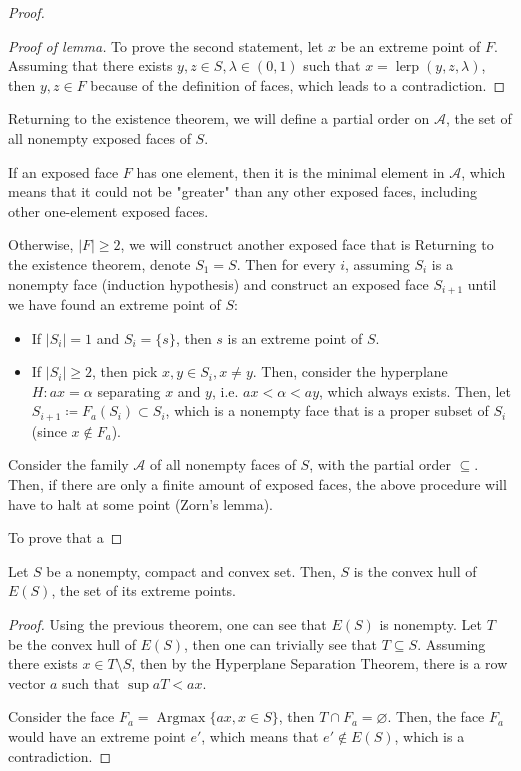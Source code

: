 \begin{proof}
\begin{proof}[Proof of lemma]
  To prove the second statement, let \( x \) be an extreme point of \( F \).
  Assuming that there exists \( y, z \in S, \lambda \in (0, 1) \) such that \( x =
  \operatorname{lerp}(y, z, \lambda) \), then \( y, z \in F \) because of the
  definition of faces, which leads to a contradiction.
\end{proof}

Returning to the existence theorem, we will define a partial order on \(
\mathcal{A} \), the set of all nonempty exposed faces of \( S \).

If an exposed face \( F \) has one element, then it is the minimal element
in \( \mathcal{A} \),
which means that it could not be "greater" than any other exposed faces,
including other one-element exposed faces.

Otherwise, \( |F| \ge 2 \), we will construct another exposed face that is 
Returning to the existence theorem, denote
\( S_{1} = S \). Then for every \( i \), assuming \( S_{i} \) is a
nonempty face (induction hypothesis) and construct an exposed face \( S_{i+1} \) until we
have found an extreme point of \( S \):
\begin{itemize}
  \item If \( |S_{i}| = 1 \) and \( S_{i} = \{ s\}   \), then \( s \) is an
    extreme point of \( S \).
  \item If \( |S_{i}| \ge  2 \), then pick \( x, y \in S_{i}, x \neq y \). Then,
    consider the hyperplane \( H: ax = \alpha \) separating \( x \) and \( y \),
    i.e. \( ax < \alpha < ay \), which always exists. Then, let \( S_{i+1}
    \coloneqq F_{a}(S_{i}) \subset S_{i} \), which is a nonempty face that is a
    proper subset of \( S_{i} \) (since \( x \notin F_{a} \)).
\end{itemize}

Consider the family \( \mathcal{A} \) of all nonempty faces of \( S \), with the partial
order \( \subseteq \). Then, if there are only a finite amount of exposed
faces, the above procedure will have to halt at some point (Zorn's lemma).

To prove that a 
\end{proof}

\begin{theorem}
  Let \( S \) be a nonempty, compact and convex set. Then, \( S \) is the convex
  hull of \( E(S) \), the set of its extreme points.
\end{theorem}

\begin{proof}
  Using the previous theorem, one can see that \( E(S) \) is nonempty.
  Let \( T \) be the convex hull of \( E(S) \), then one can trivially
  see that \( T \subseteq S \). Assuming there exists \( x \in T \setminus S \),
  then by the Hyperplane Separation Theorem, there is a row vector \( a \) such
  that \( \sup aT < ax \).

  Consider the face \( F_{a} = \operatorname{Argmax} \{ ax, x \in S \}   \),
  then \( T \cap  F_{a} = \varnothing \). Then, the face \( F_{a} \) would have
  an extreme point \( e' \), which means that \( e'  \notin E(S)\), which is a
  contradiction.
\end{proof}

